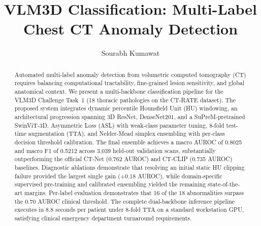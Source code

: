\documentclass[runningheads]{llncs}
\begin{document}
\title{VLM3D Classification: Multi-Label Chest CT Anomaly Detection}

\author{Sourabh Kumawat}

\maketitle

\begin{abstract}
Automated multi-label anomaly detection from volumetric computed tomography (CT) requires balancing computational tractability, fine-grained lesion sensitivity, and global anatomical context. We present a multi-backbone classification pipeline for the VLM3D Challenge Task~1 (18 thoracic pathologies on the CT-RATE dataset). The proposed system integrates dynamic percentile Hounsfield Unit (HU) windowing, an architectural progression spanning 3D ResNet, DenseNet201, and a SuPreM-pretrained SwinViT-3D, Asymmetric Loss (ASL) with weak-class parameter tuning, 8-fold test-time augmentation (TTA), and Nelder-Mead simplex ensembling with per-class decision threshold calibration. The final ensemble achieves a macro AUROC of 0.8025 and macro F1 of 0.5212 across 3,039 held-out validation scans, substantially outperforming the official CT-Net (0.762 AUROC) and CT-CLIP (0.735 AUROC) baselines. Diagnostic ablations demonstrate that resolving an initial static HU clipping failure provided the largest single gain (+0.18 AUROC), while domain-specific supervised pre-training and calibrated ensembling yielded the remaining state-of-the-art margins. Per-label evaluation demonstrates that 16 of the 18 abnormalities surpass the 0.70 AUROC clinical threshold. The complete dual-backbone inference pipeline executes in 8.8 seconds per patient under 8-fold TTA on a standard workstation GPU, satisfying clinical emergency department turnaround requirements.
\end{abstract}
\end{document}
